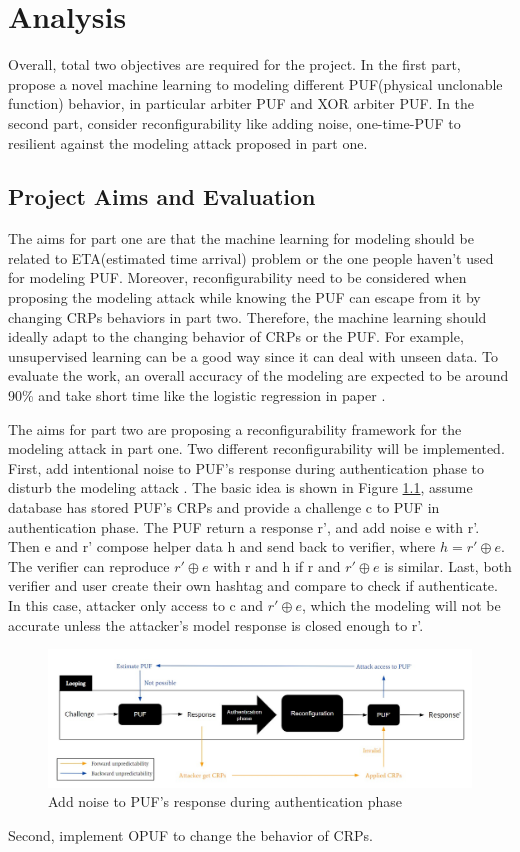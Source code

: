 \chapter{Analysis}
Overall, total two objectives are required for the project. In the first part, propose a novel machine learning to modeling different PUF(physical unclonable function)
behavior, in particular arbiter PUF and XOR arbiter PUF. In the second part, consider reconfigurability like adding noise, one-time-PUF to resilient against the modeling attack
proposed in part one.

\section{Project Aims and Evaluation}
The aims for part one are that the machine learning for modeling should be related to ETA(estimated time arrival) problem or the one people haven't used for modeling
PUF. Moreover, reconfigurability need to be considered when proposing the modeling attack while knowing the PUF can escape from it by changing CRPs behaviors in part 
two. Therefore, the machine learning should ideally adapt to the changing behavior of CRPs or the PUF. For example, unsupervised learning can be a good way since it can 
deal with unseen data. To evaluate the work, an overall accuracy of the modeling are expected to be around 90\% and take short time like the logistic regression in 
paper \cite{Reference6}.

The aims for part two are proposing a reconfigurability framework for the modeling attack in part one. Two different reconfigurability will be implemented. First, add intentional
noise to PUF's response during authentication phase to disturb the modeling attack \cite{Reference8}. The basic idea is shown in Figure \ref{fig:figure10}, assume database has stored PUF's CRPs and provide a challenge c
to PUF in authentication phase. The PUF return a response r', and add noise e with r'. Then e and r' compose helper data h and send back to verifier, where $h = r'\oplus e$. The verifier can reproduce $r'\oplus e$  
with r and h if r and $r'\oplus e$ is similar. Last, both verifier and user create their own hashtag and compare to check if authenticate. In this case, attacker only access to c and $r'\oplus e$, which the modeling
will not be accurate unless the attacker's model response is closed enough to r'.

\begin{figure}[htp]
    \centering
    \includegraphics[width=14cm]{figures/figure8.jpg}
    \caption{Add noise to PUF's response during authentication phase}
    \label{fig:figure10}
    \end{figure}
Second, implement OPUF to change the behavior of CRPs.

